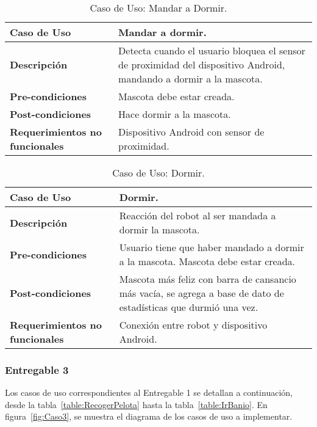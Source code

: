 \begin{table}[htbp!]
  \centering
  \begin{tabular}{|p{4cm}|p{6cm}|}\hline
    \bf{Caso de Uso}                   & Mandar a dormir. \\ \hline
    \bf{Descripci\'on}                 & Detecta cuando el usuario bloquea el sensor de proximidad del dispositivo Android, mandando a dormir a la mascota. \\ \hline
    \bf{Pre-condiciones}               & Mascota debe estar creada. \\ \hline
    \bf{Post-condiciones}              & Hace dormir a la mascota. \\ \hline
    \bf{Requerimientos no funcionales} & Dispositivo Android con sensor de proximidad. \\ \hline
  \end{tabular}
  \caption[~~Caso de Uso: Mandar a Dormir]{Caso de Uso: Mandar a Dormir.}
  \label{table:MandarDormir}
\end{table}

\begin{table}[htbp!]
  \centering
  \begin{tabular}{|p{4cm}|p{6cm}|}\hline
    \bf{Caso de Uso}                   & Dormir. \\ \hline
    \bf{Descripci\'on}                 & Reacci\'on del robot al ser mandada a dormir la mascota. \\ \hline
    \bf{Pre-condiciones}               & Usuario tiene que haber mandado a dormir a la mascota. Mascota debe estar creada. \\ \hline
    \bf{Post-condiciones}              & Mascota m\'as feliz con barra de cansancio m\'as vac\'ia, se agrega a base de dato de estad\'isticas que durmi\'o una vez. \\ \hline
    \bf{Requerimientos no funcionales} & Conexi\'on entre robot y dispositivo Android. \\ \hline
  \end{tabular}
  \caption[~~Caso de Uso: Dormir]{Caso de Uso: Dormir.}
  \label{table:Dormir}
\end{table}

% 
%
\newpage
\subsubsection{Entregable 3}

Los casos de uso correspondientes al Entregable 1 se detallan a continuaci\'on, desde la tabla~\ref{table:RecogerPelota} hasta la tabla~\ref{table:IrBanio}. En figura~\ref{fig:Caso3}, se muestra el diagrama de los casos de uso a implementar.

